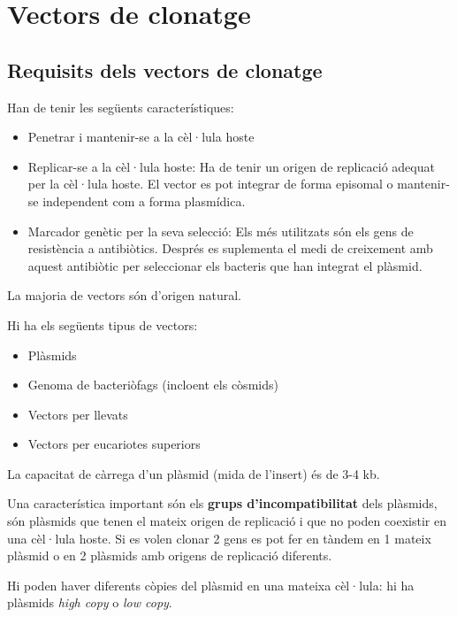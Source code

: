 \section{Vectors de clonatge}
\label{sec:vectors-de-clonatge}

\subsection{Requisits dels vectors de clonatge}
\label{sec:requ-dels-vect}

Han de tenir les següents característiques:
\begin{itemize}
\item Penetrar i mantenir-se a la cèl·lula hoste
\item Replicar-se a la cèl·lula hoste: Ha de tenir un origen de
  replicació adequat per la cèl·lula hoste. El vector es pot integrar
  de forma episomal o mantenir-se independent com a forma plasmídica.
\item Marcador genètic per la seva selecció: Els més utilitzats són
  els gens de resistència a antibiòtics. Després es suplementa el medi
  de creixement amb aquest antibiòtic per seleccionar els bacteris que
  han integrat el plàsmid.
\end{itemize}

La majoria de vectors són d'origen natural.

Hi ha els següents tipus de vectors:
\begin{itemize}
\item Plàsmids
\item Genoma de bacteriòfags (incloent els còsmids)
\item Vectors per llevats
\item Vectors per eucariotes superiors
\end{itemize}

La capacitat de càrrega d'un plàsmid (mida de l'insert) és de 3-4 kb.

Una característica important són els \textbf{grups d'incompatibilitat} dels
plàsmids, són plàsmids que tenen el mateix origen de replicació i que
no poden coexistir en una cèl·lula hoste. Si es volen clonar 2 gens es
pot fer en tàndem en 1 mateix plàsmid o en 2 plàsmids amb origens de
replicació diferents.

Hi poden haver diferents còpies del plàsmid en una mateixa cèl·lula:
hi ha plàsmids \textit{high copy} o \textit{low copy}.

